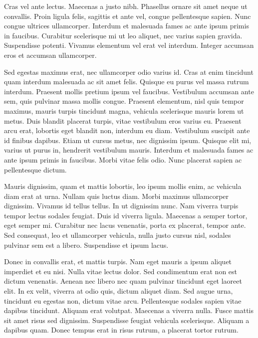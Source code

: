 \documentclass[10pt,landscape, a4paper]{article}
\begin{document}
\begin{multicols}{4}
Cras vel ante lectus. Maecenas a justo nibh. Phasellus ornare sit amet neque ut convallis. Proin ligula felis, sagittis et ante vel, congue pellentesque sapien. Nunc congue ultrices ullamcorper. Interdum et malesuada fames ac ante ipsum primis in faucibus. Curabitur scelerisque mi ut leo aliquet, nec varius sapien gravida. Suspendisse potenti. Vivamus elementum vel erat vel interdum. Integer accumsan eros et accumsan ullamcorper.

Sed egestas maximus erat, nec ullamcorper odio varius id. Cras at enim tincidunt quam interdum malesuada ac sit amet felis. Quisque eu purus vel massa rutrum interdum. Praesent mollis pretium ipsum vel faucibus. Vestibulum accumsan ante sem, quis pulvinar massa mollis congue. Praesent elementum, nisl quis tempor maximus, mauris turpis tincidunt magna, vehicula scelerisque mauris lorem ut metus. Duis blandit placerat turpis, vitae vestibulum eros varius eu. Praesent arcu erat, lobortis eget blandit non, interdum eu diam. Vestibulum suscipit ante id finibus dapibus. Etiam ut cursus metus, nec dignissim ipsum. Quisque elit mi, varius ut purus in, hendrerit vestibulum mauris. Interdum et malesuada fames ac ante ipsum primis in faucibus. Morbi vitae felis odio. Nunc placerat sapien ac pellentesque dictum.

Mauris dignissim, quam et mattis lobortis, leo ipsum mollis enim, ac vehicula diam erat at urna. Nullam quis luctus diam. Morbi maximus ullamcorper dignissim. Vivamus id tellus tellus. In ut dignissim nunc. Nam viverra turpis tempor lectus sodales feugiat. Duis id viverra ligula. Maecenas a semper tortor, eget semper mi. Curabitur nec lacus venenatis, porta ex placerat, tempor ante. Sed consequat, leo et ullamcorper vehicula, nulla justo cursus nisl, sodales pulvinar sem est a libero. Suspendisse et ipsum lacus.

Donec in convallis erat, et mattis turpis. Nam eget mauris a ipsum aliquet imperdiet et eu nisi. Nulla vitae lectus dolor. Sed condimentum erat non est dictum venenatis. Aenean nec libero nec quam pulvinar tincidunt eget laoreet elit. In ex velit, viverra at odio quis, dictum aliquet diam. Sed augue urna, tincidunt eu egestas non, dictum vitae arcu. Pellentesque sodales sapien vitae dapibus tincidunt. Aliquam erat volutpat. Maecenas a viverra nulla. Fusce mattis sit amet risus sed dignissim. Suspendisse feugiat vehicula scelerisque. Aliquam a dapibus quam. Donec tempus erat in risus rutrum, a placerat tortor rutrum.


\end{multicols}
\end{document}
